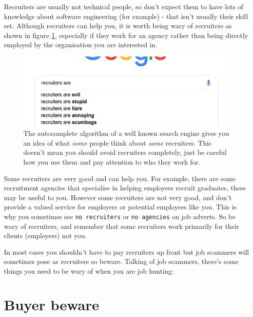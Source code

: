 \documentclass[
]{book}
\begin{document}
Recruiters are usually not technical people, so don't expect them to have lots of knowledge about software engineering (for example) - that isn't usually their skill set. Although recruiters can help you, it is worth being wary of recruiters as shown in figure \ref{fig:recruiter-fig}, especially if they work for an agency rather than being directly employed by the organisation you are interested in.

\begin{figure}

{\centering \includegraphics[width=0.9\linewidth]{images/recruiters-are} 

}

\caption{The autocomplete algorithm of a well known search engine gives you an idea of what \emph{some} people think about \emph{some} recruiters. This doesn't mean you should avoid recruiters completely, just be careful how you use them and pay attention to who they work for.}\label{fig:recruiter-fig}
\end{figure}



Some recruiters are very good and can help you. For example, there are some recruitment agencies that specialise in helping employers recruit graduates, these may be useful to you. However some recruiters are not very good, and don't provide a valued service for employers or potential employees like you. This is why you sometimes see \texttt{no\ recruiters} or \texttt{no\ agencies} on job adverts. So be wary of recruiters, and remember that some recruiters work primarily for their clients (employers) not you.

In most cases you shouldn't have to pay recruiters up front but job scammers will sometimes pose as recruiters so beware. Talking of job scammers, there's some things you need to be wary of when you are job hunting:

\hypertarget{beware}{%
\section{Buyer beware}\label{beware}}
\end{document}
